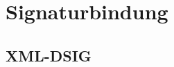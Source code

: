 
\chapter{Signaturbindung}
%
\label{chp:Signaturbindung}%


\section{XML-DSIG}
%
\label{sec:Signaturbindung:xml-dsig}%
